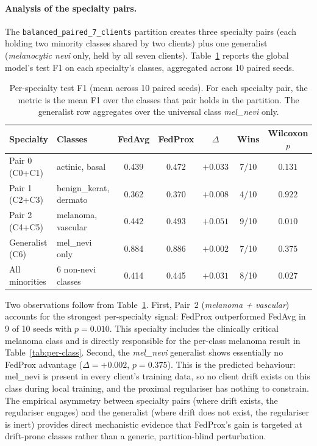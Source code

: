 \documentclass[11pt,a4paper]{article}
\begin{document}
\paragraph{Analysis of the specialty pairs.}
The \texttt{balanced\_paired\_7\_clients} partition creates three specialty
pairs (each holding two minority classes shared by two clients) plus one
generalist (\textit{melanocytic nevi} only, held by all seven clients).
Table~\ref{tab:per-specialty} reports the global model's test F1 on each
specialty's classes, aggregated across 10 paired seeds.

\begin{table}[!htbp]
\centering
\small
\begin{tabular}{llccccc}
\toprule
Specialty & Classes & FedAvg & FedProx & $\Delta$ & Wins & Wilcoxon $p$ \\
\midrule
Pair 0 (C0+C1)       & actinic, basal           & 0.439 & 0.472 & $+0.033$           & 7/10 & $0.131$ \\
Pair 1 (C2+C3)       & benign\_kerat, dermato    & 0.362 & 0.370 & $+0.008$           & 4/10 & $0.922$ \\
Pair 2 (C4+C5)       & melanoma, vascular       & 0.442 & 0.493 & $\mathbf{+0.051}$  & 9/10 & $\mathbf{0.010}$ \\
Generalist (C6)      & mel\_nevi only            & 0.884 & 0.886 & $+0.002$           & 7/10 & $0.375$ \\
All minorities       & 6 non-nevi classes       & 0.414 & 0.445 & $\mathbf{+0.031}$  & 8/10 & $\mathbf{0.027}$ \\
\bottomrule
\end{tabular}
\caption{Per-specialty test F1 (mean across 10 paired seeds). For each
specialty pair, the metric is the mean F1 over the classes that pair holds in
the partition. The generalist row aggregates over the universal class
\textit{mel\_nevi} only.}
\label{tab:per-specialty}
\end{table}

Two observations follow from Table~\ref{tab:per-specialty}. First, Pair~2
(\textit{melanoma + vascular}) accounts for the strongest per-specialty
signal: FedProx outperformed FedAvg in 9 of 10 seeds with $p = 0.010$. This
specialty includes the clinically critical melanoma class and is directly
responsible for the per-class melanoma result in Table~\ref{tab:per-class}.
Second, the \textit{mel\_nevi} generalist shows essentially no FedProx
advantage ($\Delta = +0.002$, $p = 0.375$). This is the predicted behaviour:
mel\_nevi is present in every client's training data, so no client drift
exists on this class during local training, and the proximal regulariser has
nothing to constrain. The empirical asymmetry between specialty pairs (where
drift exists, the regulariser engages) and the generalist (where drift does
not exist, the regulariser is inert) provides direct mechanistic evidence
that FedProx's gain is targeted at drift-prone classes rather than a
generic, partition-blind perturbation.
\end{document}
